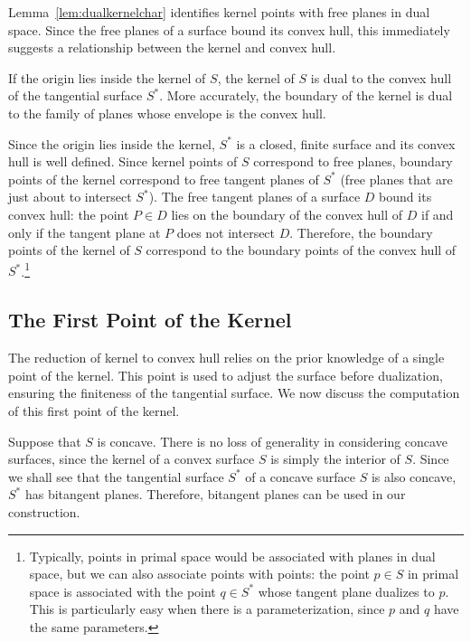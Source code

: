 \documentclass{elsart}
\begin{document}
Lemma~\ref{lem:dualkernelchar} identifies kernel points
with free planes in dual space.
Since the free planes of a surface bound its convex hull,
this immediately suggests a relationship between the kernel and convex hull.

\begin{theorem}
\label{thm:kernelhull}
If the origin lies inside the kernel of $S$,
the kernel of $S$ is dual to the convex hull of the tangential surface $S^*$.
More accurately, the boundary of the kernel is dual to the family of planes whose
envelope is the convex hull.
\end{theorem}
\prf
Since the origin lies inside the kernel, $S^*$ is a closed, finite surface
and its convex hull is well defined.
Since kernel points of $S$ correspond to free planes,
boundary points of the kernel correspond to free tangent planes of $S^*$
(free planes that are just about to intersect $S^*$).
The free tangent planes of a surface $D$ bound its convex hull: the point $P \in D$ lies
on the boundary of the convex hull of $D$ if and only if the tangent plane at $P$ 
does not intersect $D$.
Therefore, the boundary points of the kernel of $S$ correspond to the boundary points
of the convex hull of $S^*$.\footnote{Typically, points in primal space would be associated with planes in dual space,
	but we can also associate points with points:
	the point $p \in S$ in primal space is associated
	with the point $q \in S^*$ whose tangent plane dualizes to $p$.
	This is particularly easy when there is a parameterization, since $p$ and $q$ 
	have the same parameters.}
\QED


\subsection{The First Point of the Kernel}
\label{sec:firstpt}

The reduction of kernel to convex hull relies on the prior knowledge
of a single point of the kernel.
This point is used to adjust the surface before dualization, ensuring
the finiteness of the tangential surface.
We now discuss the computation of this first point of the kernel.

Suppose that $S$ is concave.
There is no loss of generality in considering concave surfaces,
since the kernel of a convex surface $S$ is simply the interior of $S$.
Since we shall see that the tangential surface $S^*$ of
a concave surface $S$ is also concave, $S^*$ has bitangent planes.
Therefore, bitangent planes can be used in our construction. %
\end{document}
